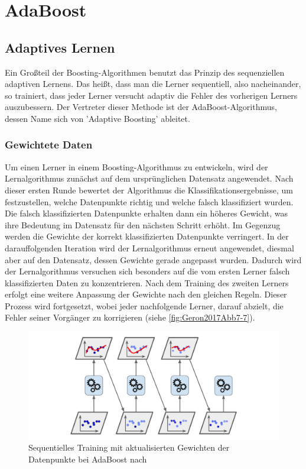 \section{AdaBoost}
\subsection{Adaptives Lernen}
Ein Großteil der Boosting-Algorithmen benutzt das Prinzip des sequenziellen adaptiven Lernens. Das heißt, dass man die Lerner sequentiell, also nacheinander, so trainiert, dass jeder Lerner versucht adaptiv die Fehler des vorherigen Lerners auszubessern.
\newline
Der Vertreter dieser Methode ist der AdaBoost-Algorithmus, dessen Name sich von 'Adaptive Boosting' ableitet.
\subsubsection{Gewichtete Daten}
Um einen Lerner in einem Boosting-Algorithmus zu entwickeln, wird der Lernalgorithmus zunächst auf dem ursprünglichen Datensatz angewendet. Nach dieser ersten Runde bewertet der Algorithmus die Klassifikationsergebnisse, um festzustellen, welche Datenpunkte richtig und welche falsch klassifiziert wurden. Die falsch klassifizierten Datenpunkte erhalten dann ein höheres Gewicht, was ihre Bedeutung im Datensatz für den nächsten Schritt erhöht. Im Gegenzug werden die Gewichte der korrekt klassifizierten Datenpunkte verringert.
\newline
In der darauffolgenden Iteration wird der Lernalgorithmus erneut angewendet, diesmal aber auf den Datensatz, dessen Gewichte gerade angepasst wurden. Dadurch wird der Lernalgorithmus versuchen sich besonders auf die vom ersten Lerner falsch klassifizierten Daten zu konzentrieren. Nach dem Training des zweiten Lerners erfolgt eine weitere Anpassung der Gewichte nach den gleichen Regeln.
\newline
Dieser Prozess wird fortgesetzt, wobei jeder nachfolgende Lerner, darauf abzielt, die Fehler seiner Vorgänger zu korrigieren (siehe \autoref{fig:Geron2017Abb7-7}).

\begin{figure}[h]
    \centering
    \includegraphics[width=\linewidth]{Images/Geron2017Abb7-7.png}
    \caption{Sequentielles Training mit aktualisierten Gewichten der Datenpunkte bei AdaBoost nach \textcite[Abbildung 7-7][S.~192]{Geron2018}}
    \label{fig:Geron2017Abb7-7}
\end{figure}

